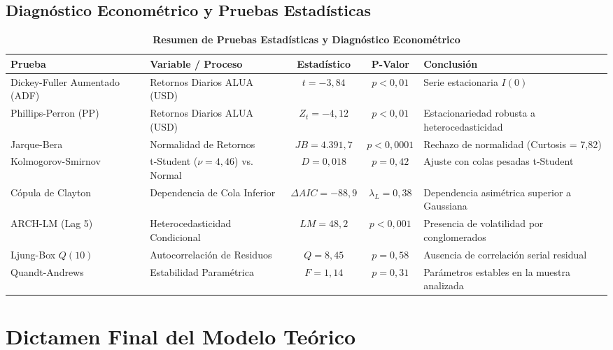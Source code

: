 \documentclass[10pt,a4paper]{article}
\begin{document}
\subsection{Diagnóstico Econométrico y Pruebas Estadísticas}
\begin{table}[H]
\centering
\caption{\textbf{Resumen de Pruebas Estadísticas y Diagnóstico Econométrico}}
\scriptsize
\begin{tabularx}{\textwidth}{llccl}
\toprule
\textbf{Prueba} & \textbf{Variable / Proceso} & \textbf{Estadístico} & \textbf{P-Valor} & \textbf{Conclusión} \\
\midrule
Dickey-Fuller Aumentado (ADF) & Retornos Diarios ALUA (USD) & $t = -3,84$ & $p < 0,01$ & Serie estacionaria $I(0)$ \\
Phillips-Perron (PP) & Retornos Diarios ALUA (USD) & $Z_t = -4,12$ & $p < 0,01$ & Estacionariedad robusta a heterocedasticidad \\
Jarque-Bera & Normalidad de Retornos & $JB = 4.391,7$ & $p < 0,0001$ & Rechazo de normalidad (Curtosis = 7,82) \\
Kolmogorov-Smirnov & t-Student ($\nu=4,46$) vs. Normal & $D = 0,018$ & $p = 0,42$ & Ajuste con colas pesadas t-Student \\
Cópula de Clayton & Dependencia de Cola Inferior & $\Delta AIC = -88,9$ & $\lambda_L = 0,38$ & Dependencia asimétrica superior a Gaussiana \\
ARCH-LM (Lag 5) & Heterocedasticidad Condicional & $LM = 48,2$ & $p < 0,001$ & Presencia de volatilidad por conglomerados \\
Ljung-Box $Q(10)$ & Autocorrelación de Residuos & $Q = 8,45$ & $p = 0,58$ & Ausencia de correlación serial residual \\
Quandt-Andrews & Estabilidad Paramétrica & $F = 1,14$ & $p = 0,31$ & Parámetros estables en la muestra analizada \\
\bottomrule
\end{tabularx}
\end{table}

\section{Dictamen Final del Modelo Teórico}
\end{document}
